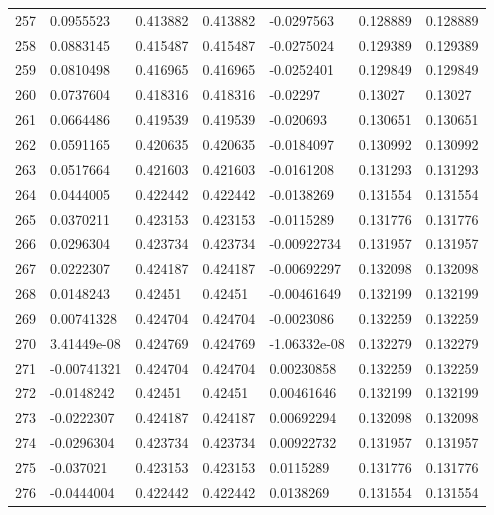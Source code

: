 \begin{longtable}{l|lll|lll}
 257 &  0.0955523   & 0.413882    & 0.413882    & -0.0297563   & 0.128889    & 0.128889    \\
 258 &  0.0883145   & 0.415487    & 0.415487    & -0.0275024   & 0.129389    & 0.129389    \\
 259 &  0.0810498   & 0.416965    & 0.416965    & -0.0252401   & 0.129849    & 0.129849    \\
 260 &  0.0737604   & 0.418316    & 0.418316    & -0.02297     & 0.13027     & 0.13027     \\
 261 &  0.0664486   & 0.419539    & 0.419539    & -0.020693    & 0.130651    & 0.130651    \\
 262 &  0.0591165   & 0.420635    & 0.420635    & -0.0184097   & 0.130992    & 0.130992    \\
 263 &  0.0517664   & 0.421603    & 0.421603    & -0.0161208   & 0.131293    & 0.131293    \\
 264 &  0.0444005   & 0.422442    & 0.422442    & -0.0138269   & 0.131554    & 0.131554    \\
 265 &  0.0370211   & 0.423153    & 0.423153    & -0.0115289   & 0.131776    & 0.131776    \\
 266 &  0.0296304   & 0.423734    & 0.423734    & -0.00922734  & 0.131957    & 0.131957    \\
 267 &  0.0222307   & 0.424187    & 0.424187    & -0.00692297  & 0.132098    & 0.132098    \\
 268 &  0.0148243   & 0.42451     & 0.42451     & -0.00461649  & 0.132199    & 0.132199    \\
 269 &  0.00741328  & 0.424704    & 0.424704    & -0.0023086   & 0.132259    & 0.132259    \\
 270 &  3.41449e-08 & 0.424769    & 0.424769    & -1.06332e-08 & 0.132279    & 0.132279    \\
 271 & -0.00741321  & 0.424704    & 0.424704    &  0.00230858  & 0.132259    & 0.132259    \\
 272 & -0.0148242   & 0.42451     & 0.42451     &  0.00461646  & 0.132199    & 0.132199    \\
 273 & -0.0222307   & 0.424187    & 0.424187    &  0.00692294  & 0.132098    & 0.132098    \\
 274 & -0.0296304   & 0.423734    & 0.423734    &  0.00922732  & 0.131957    & 0.131957    \\
 275 & -0.037021    & 0.423153    & 0.423153    &  0.0115289   & 0.131776    & 0.131776    \\
 276 & -0.0444004   & 0.422442    & 0.422442    &  0.0138269   & 0.131554    & 0.131554    \\

\end{longtable}
